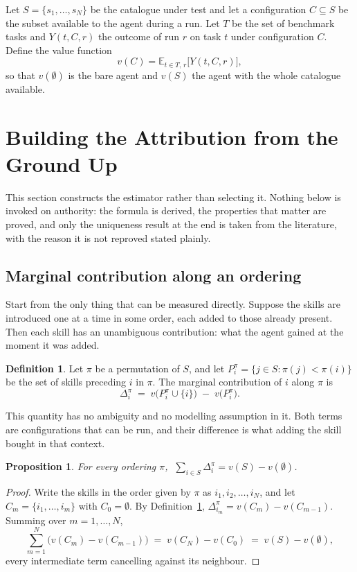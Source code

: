 \documentclass[11pt]{article}
\theoremstyle{plain}
\newtheorem{proposition}[theorem]{Proposition}
\theoremstyle{definition}
\newtheorem{definition}[theorem]{Definition}
\theoremstyle{remark}
\newcommand{\lift}{v(S) - v(\emptyset)}
\begin{document}
Let $S = \{s_1,\dots,s_N\}$ be the catalogue under test and let a configuration $C \subseteq S$ be the subset available to the agent during a run. Let $T$ be the set of benchmark tasks and $Y(t,C,r)$ the outcome of run $r$ on task $t$ under configuration $C$. Define the value function
\[
v(C) = \mathbb{E}_{t \in T,\, r}\big[Y(t,C,r)\big],
\]
so that $v(\emptyset)$ is the bare agent and $v(S)$ the agent with the whole catalogue available.

\section{Building the Attribution from the Ground Up}
\label{sec:axioms}

This section constructs the estimator rather than selecting it. Nothing below is invoked on authority: the formula is derived, the properties that matter are proved, and only the uniqueness result at the end is taken from the literature, with the reason it is not reproved stated plainly.

\subsection{Marginal contribution along an ordering}

Start from the only thing that can be measured directly. Suppose the skills are introduced one at a time in some order, each added to those already present. Then each skill has an unambiguous contribution: what the agent gained at the moment it was added.

\begin{definition}\label{def:order}
Let $\pi$ be a permutation of $S$, and let $P_i^\pi = \{ j \in S : \pi(j) < \pi(i)\}$ be the set of skills preceding $i$ in $\pi$. The marginal contribution of $i$ along $\pi$ is
\[
\Delta_i^\pi \;=\; v\big(P_i^\pi \cup \{i\}\big) \;-\; v\big(P_i^\pi\big).
\]
\end{definition}

This quantity has no ambiguity and no modelling assumption in it. Both terms are configurations that can be run, and their difference is what adding the skill bought in that context.

\begin{proposition}\label{prop:telescope}
For every ordering $\pi$, $\;\sum_{i \in S} \Delta_i^\pi = \lift$.
\end{proposition}

\begin{proof}
Write the skills in the order given by $\pi$ as $i_1, i_2, \dots, i_N$, and let $C_m = \{i_1,\dots,i_m\}$ with $C_0 = \emptyset$. By Definition~\ref{def:order}, $\Delta_{i_m}^\pi = v(C_m) - v(C_{m-1})$. Summing over $m = 1,\dots,N$,
\[
\sum_{m=1}^{N} \big(v(C_m) - v(C_{m-1})\big) \;=\; v(C_N) - v(C_0) \;=\; \lift,
\]
every intermediate term cancelling against its neighbour.
\end{proof}
\end{document}

